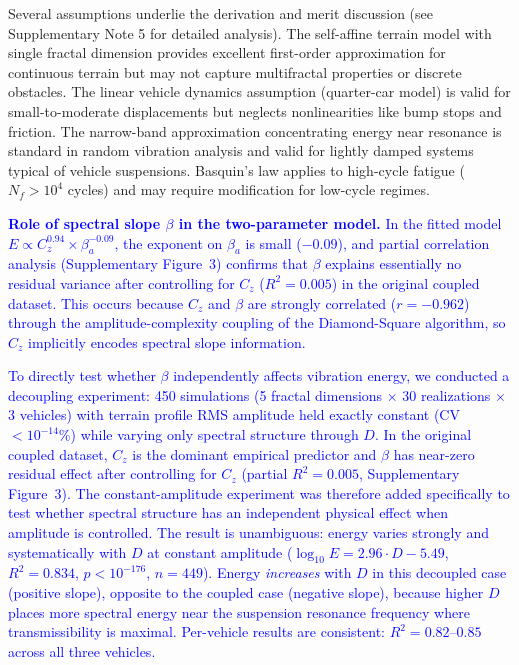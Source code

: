 \documentclass[11pt]{article}
\begin{document}
Several assumptions underlie the derivation and merit discussion (see Supplementary Note 5 for detailed analysis). The self-affine terrain model with single fractal dimension provides excellent first-order approximation for continuous terrain but may not capture multifractal properties or discrete obstacles\cite{Persson2005}. The linear vehicle dynamics assumption (quarter-car model) is valid for small-to-moderate displacements but neglects nonlinearities like bump stops and friction\cite{Wong2022,Gillespie1992}. The narrow-band approximation concentrating energy near resonance is standard in random vibration analysis\cite{Miles1954,Bendat2010} and valid for lightly damped systems typical of vehicle suspensions. Basquin's law applies to high-cycle fatigue ($N_f > 10^4$ cycles) and may require modification for low-cycle regimes\cite{Dowling2013}.

\textcolor{blue}{\textbf{Role of spectral slope $\beta$ in the two-parameter model.} In the fitted model $E \propto C_z^{0.94} \times \beta_a^{-0.09}$, the exponent on $\beta_a$ is small ($-0.09$), and partial correlation analysis (Supplementary Figure~3) confirms that $\beta$ explains essentially no residual variance after controlling for $C_z$ ($R^2 = 0.005$) in the original coupled dataset. This occurs because $C_z$ and $\beta$ are strongly correlated ($r = -0.962$) through the amplitude-complexity coupling of the Diamond-Square algorithm, so $C_z$ implicitly encodes spectral slope information.}

\textcolor{blue}{To directly test whether $\beta$ independently affects vibration energy, we conducted a decoupling experiment: 450 simulations (5 fractal dimensions $\times$ 30 realizations $\times$ 3 vehicles) with terrain profile RMS amplitude held exactly constant (CV $< 10^{-14}$\%) while varying only spectral structure through $D$. In the original coupled dataset, $C_z$ is the dominant empirical predictor and $\beta$ has near-zero residual effect after controlling for $C_z$ (partial $R^2 = 0.005$, Supplementary Figure~3). The constant-amplitude experiment was therefore added specifically to test whether spectral structure has an independent physical effect when amplitude is controlled. The result is unambiguous: energy varies strongly and systematically with $D$ at constant amplitude ($\log_{10} E = 2.96 \cdot D - 5.49$, $R^2 = 0.834$, $p < 10^{-176}$, $n = 449$). Energy \emph{increases} with $D$ in this decoupled case (positive slope), opposite to the coupled case (negative slope), because higher $D$ places more spectral energy near the suspension resonance frequency where transmissibility is maximal. Per-vehicle results are consistent: $R^2 = 0.82$--$0.85$ across all three vehicles.}
\end{document}

